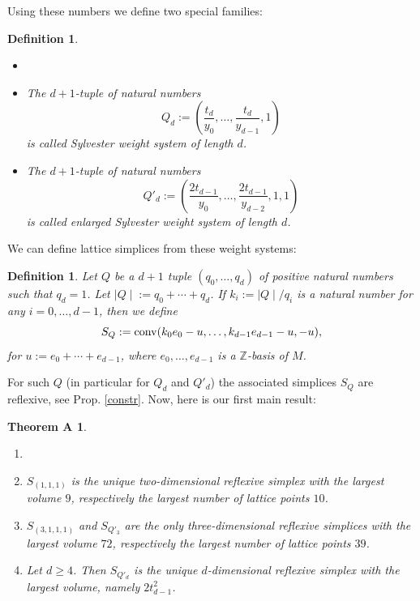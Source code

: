 \documentclass[a4paper,twoside]{article}
\newcommand{\card}[1]{{\mid\! #1 \!\mid}}
\def\Z{{\mathbb Z}}
\def\conv{{\rm conv}}
\newtheorem*{theoremA*}{Theorem A}
\newtheorem{definition}[theorem]{Definition}
\begin{document}
Using these numbers we define two special families:

\pagebreak

\begin{definition}{\rm 
\begin{itemize}
\item[]
\item The $d+1$-tuple of natural numbers 
$$Q_d := (\frac{t_d}{y_0}, \ldots, \frac{t_d}{y_{d-1}}, 1)$$ 
is called {\em Sylvester weight system} of length $d$.
\item The $d+1$-tuple of natural numbers 
$$Q'_d := (\frac{2 t_{d-1}}{y_0}, \ldots, \frac{2 t_{d-1}}{y_{d-2}}, 1, 1)$$ 
is called {\em enlarged Sylvester weight system} of length $d$.
\end{itemize}
\label{modisylv}
}
\end{definition}

We can define lattice simplices from these weight systems:

\begin{definition}{\rm 
Let $Q$ be a $d+1$ tuple $(q_0, \ldots, q_d)$ of positive natural numbers such that $q_d = 1$. Let $\card{Q} := q_0 + \cdots + q_d$. 
If $k_i := \card{Q}/q_i$ is a natural number for any $i = 0, \ldots, d-1$, then we define 
\[S_Q := \conv(k_0 e_0 - u, \ldots, k_{d-1} e_{d-1} - u, -u),\]
for $u := e_0 + \cdots + e_{d-1}$, where $e_0, \ldots, e_{d-1}$ is a $\Z$-basis of $M$.
\label{explicit}
}
\end{definition}

For such $Q$ (in particular for $Q_d$ and $Q'_d$) the associated simplices $S_Q$ are reflexive, see Prop. \ref{constr}. 
Now, here is our first main result:

\begin{theoremA*}
\begin{enumerate}
\item[]
\item $S_{(1,1,1)}$ is the unique two-dimensional reflexive simplex with the largest volume $9$, 
respectively the largest number of lattice points $10$. 
\item $S_{(3,1,1,1)}$ and $S_{Q'_3}$ are the only three-dimensional reflexive simplices with the largest 
volume $72$, respectively the largest number of lattice points $39$. 
\item Let $d \geq 4$. Then $S_{Q'_d}$ is the unique $d$-dimensional reflexive simplex with the largest volume, namely $2 t_{d-1}^2$. 
\end{enumerate}
\label{theAs}
\end{theoremA*}
\end{document}
